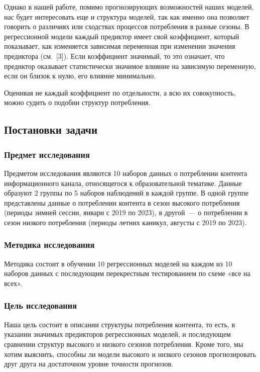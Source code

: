 \documentclass[a4paper,12pt]{article}
\begin{document}
Однако в нашей работе, помимо прогнозирующих возможностей наших моделей, нас будет интересовать еще и структура моделей, так как именно она позволяет говорить о различиях или сходствах процессов потребления в разные сезоны. В регрессионной модели каждый предиктор имеет свой коэффициент, который показывает, как изменяется зависимая переменная при изменении значения предиктора (см. [3]). Если коэффициент значимый, то это означает, что предиктор оказывает статистически значимое влияние на зависимую переменную, если он близок к нулю, его влияние минимально. 

Оценивая не каждый коэффициент по отдельности, а всю их совокупность, можно судить о подобии структур потребления.

\subsection{Постановки задачи}

\subsubsection{Предмет исследования} Предметом исследования являются 10 наборов данных о потреблении контента информационного канала, относящегося к образовательной тематике. Данные образуют 2 группы по 5 наборов наблюдений в каждой группе. В одной группе представлены данные о потреблении контента в сезон высокого потребления (периоды зимней сессии, январи с 2019 по 2023), в другой — о потреблении в сезон низкого потребления (периоды летних каникул, августы с 2019 по 2023).

\subsubsection{Методика исследования} Методика состоит в обучении 10 регрессионных моделей на каждом из 10 наборов данных с последующим перекрестным тестированием по схеме «все на всех».

\subsubsection{Цель исследования} Наша цель состоит в описании структуры потребления контента, то есть, в указании значимых предикторов регрессионных моделей, и последующем сравнении структур высокого и низкого сезонов потребления. Кроме того, мы хотим выяснить, способны ли модели высокого и низкого сезонов прогнозировать друг друга на достаточном уровне точности прогнозов.
\end{document}
